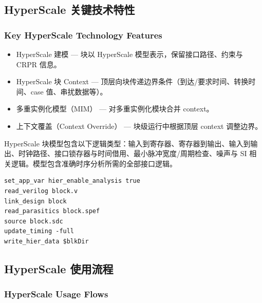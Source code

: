 

\subsection{HyperScale 关键技术特性}
\subsubsection*{Key HyperScale Technology Features}

\begin{itemize}
  \item HyperScale 建模 — 块以 HyperScale 模型表示，保留接口路径、约束与 CRPR 信息。
  \item HyperScale 块 Context — 顶层向块传递边界条件（到达/要求时间、转换时间、case 值、串扰数据等）。
  \item 多重实例化模型（MIM） — 对多重实例化模块合并 context。
  \item 上下文覆盖（Context Override） — 块级运行中根据顶层 context 调整边界。
\end{itemize}

HyperScale 块模型包含以下逻辑类型：输入到寄存器、寄存器到输出、输入到输出、时钟路径、接口锁存器与时间借用、最小脉冲宽度/周期检查、噪声与 SI 相关逻辑。模型包含准确时序分析所需的全部接口逻辑。

\begin{lstlisting}
set_app_var hier_enable_analysis true
read_verilog block.v
link_design block
read_parasitics block.spef
source block.sdc
update_timing -full
write_hier_data $blkDir
\end{lstlisting}




\subsection{HyperScale 使用流程}
\subsubsection*{HyperScale Usage Flows}

